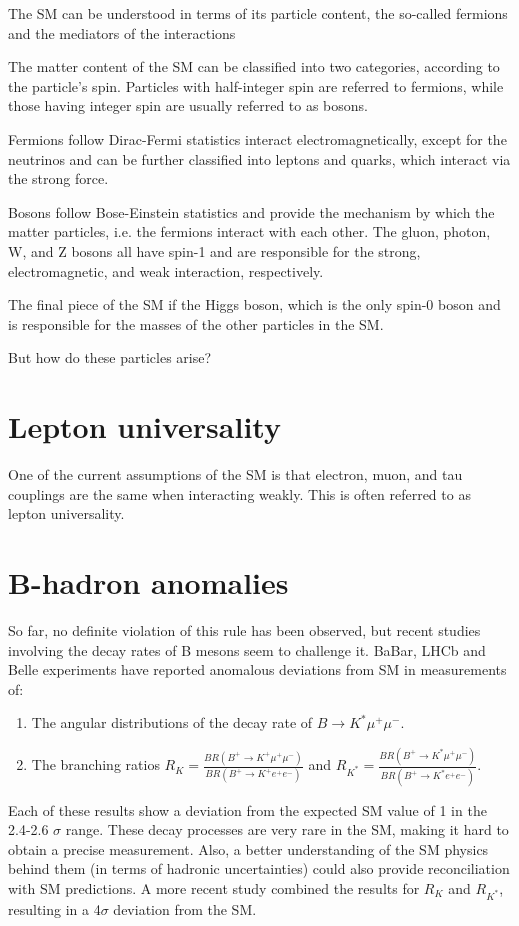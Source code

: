 The SM can be understood in terms of its particle content, the so-called fermions and the mediators of the interactions

The matter content of the SM can be classified into two categories, according to the particle's spin. Particles with half-integer spin are referred to fermions, while those having integer spin are usually referred to as bosons.

Fermions follow Dirac-Fermi statistics interact electromagnetically, except for the neutrinos and can be further classified into leptons and quarks, which interact via the strong force.

Bosons follow Bose-Einstein statistics and provide the mechanism by which the matter particles, i.e. the fermions interact with each other. The gluon, photon, W, and Z bosons all have spin-1 and are responsible for the strong, electromagnetic, and weak interaction, respectively.

The final piece of the SM if the Higgs boson, which is the only spin-0 boson and is responsible for the masses of the other particles in the SM.

But how do these particles arise?



\section{Lepton universality}
One of the current assumptions of the SM is that electron, muon, and tau couplings are the same when interacting weakly. This is often referred to as lepton universality. 

\section{B-hadron anomalies}
So far, no definite violation of this rule has been observed, but recent studies involving the decay rates of B mesons seem to challenge it. BaBar, LHCb and Belle experiments have reported anomalous deviations from SM in measurements of:

\begin{enumerate}
    \item The angular distributions of the decay rate of $B\rightarrow K^{*}\mu^{+}\mu^{-}$.
    \item The branching ratios $R_{K} = \frac{BR(B^{+}\rightarrow K^{+}\mu^{+}\mu^{-})}{BR(B^{+}\rightarrow K^{+}e^{+}e^{-})}$ and $R_{K^{*}} = \frac{BR(B^{+}\rightarrow K^{*}\mu^{+}\mu^{-})}{BR(B^{+}\rightarrow K^{*}e^{+}e^{-})}$.
\end{enumerate}
Each of these results show a deviation from the expected SM value of 1 in the 2.4-2.6 $\sigma$ range. These decay processes are very rare in the SM, making it hard to obtain a precise measurement. Also, a better understanding of the SM physics behind them (in terms of hadronic uncertainties) could also provide reconciliation with SM predictions. A more recent study combined the results for $R_{K}$ and $R_{K^{*}}$, resulting in a 4$\sigma$ deviation from the SM. 
